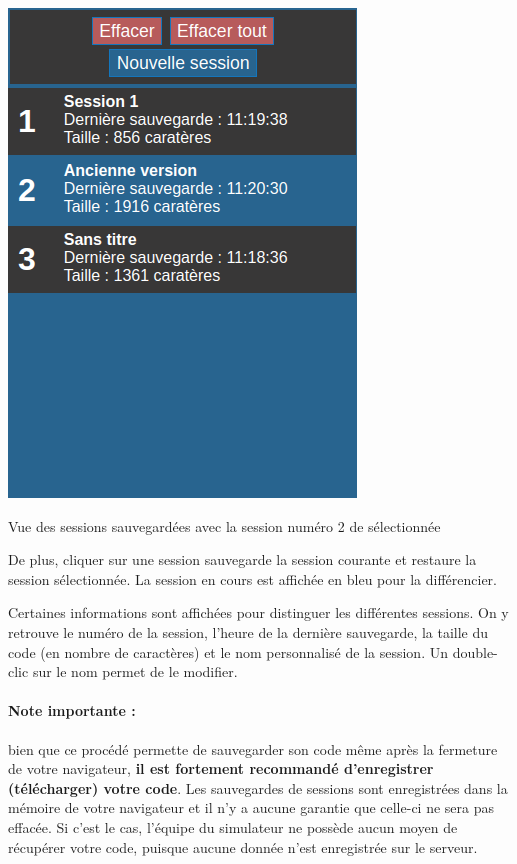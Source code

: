 \documentclass{tufte-handout}
\begin{document}
\begin{marginfigure}
\includegraphics[width=\linewidth]{pics/session_open.png}
\label{f:session_open}
\caption{Vue des sessions sauvegardées avec la session numéro 2 de sélectionnée}
\end{marginfigure}

De plus, cliquer sur une session sauvegarde la session courante et restaure la session sélectionnée. La session en cours est affichée en bleu pour la différencier.

Certaines informations sont affichées pour distinguer les différentes sessions. On y retrouve le numéro de la session, l'heure de la dernière sauvegarde, la taille du code (en nombre de caractères) et le nom personnalisé de la session. Un double-clic sur le nom permet de le modifier.

\paragraph{\textbf{Note importante :}} bien que ce procédé permette de sauvegarder son code même après la fermeture de votre navigateur, \textbf{il est fortement recommandé d'enregistrer (télécharger) votre code}. Les sauvegardes de sessions sont enregistrées dans la mémoire de votre navigateur et il n'y a aucune garantie que celle-ci ne sera pas effacée. Si c'est le cas, l'équipe du simulateur ne possède aucun moyen de récupérer votre code, puisque aucune donnée n'est enregistrée sur le serveur.  
\end{document}
